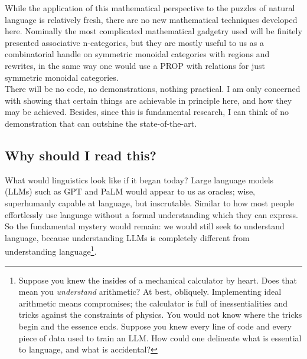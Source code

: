 While the application of this mathematical perspective to the puzzles of natural language is relatively fresh, there are no new mathematical techniques developed here. Nominally the most complicated mathematical gadgetry used will be finitely presented associative n-categories, but they are mostly useful to us as a combinatorial handle on symmetric monoidal categories with regions and rewrites, in the same way one would use a PROP with relations for just symmetric monoidal categories.\\

There will be no code, no demonstrations, nothing practical. I am only concerned with showing that certain things are achievable in principle here, and how they may be achieved. Besides, since this is fundamental research, I can think of no demonstration that can outshine the state-of-the-art.

\subsection{Why should I read this?}
What would linguistics look like if it began today?
Large language models (LLMs) such as GPT and PaLM would appear to us as oracles;
wise, superhumanly capable at language, but inscrutable.
Similar to how most people effortlessly use language without a formal understanding which they can express.
So the fundamental mystery would remain: we would still seek to understand language, because understanding LLMs is completely different from understanding language\footnote{
Suppose you knew the insides of a mechanical calculator by heart.
Does that mean you \emph{understand} arithmetic?
At best, obliquely.
Implementing ideal arithmetic means compromises;
the calculator is full of inessentialities and tricks against the constraints of physics.
You would not know where the tricks begin and the essence ends.
Suppose you knew every line of code and every piece of data used to train an LLM.
How could one delineate what is essential to language, and what is accidental?}.\\

